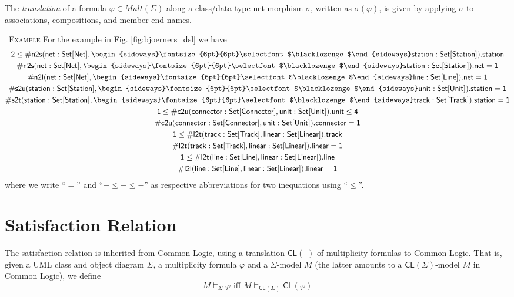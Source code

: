 \documentclass[10pt,fleqn,%
\ifpretendfinal
final%
\else
draft%
\fi,
]{scrreprt}
\newcommand*{\CL}{\ensuremath{\mathsf{CL}}\xspace}
\newenvironment{example}[0]{\ \newline \textsc{Example}\quad }{}
\newcommand{\composition}{\raisebox{0.2pt}{\begin{sideways}\fontsize{6pt}{6pt}\selectfont$\blacklozenge$\end{sideways}}}
\begin{document}
The \emph{translation} of a formula $\varphi \in \mathit{Mult}(\Sigma)$
along a class/data type net morphism $\sigma$, written as $\sigma(\varphi)$,
is given by applying $\sigma$ to associations, compositions, and member end
names.


\begin{example}
For the example in Fig. \ref{fig:bjoerners_dsl} we have
\begin{gather*}
  \mathsf{2 \leq \#n2s(net : Set[Net], \composition station : Set[Station]).station}
\\
  \mathsf{\#n2s(net : Set[Net], \composition station : Set[Station]).net = 1}
\\
  \mathsf{\#n2l(net : Set[Net], \composition line : Set[Line]).net = 1}
\\
  \mathsf{\#s2u(station : Set[Station], \composition unit : Set[Unit]).station = 1}
\\
  \mathsf{\#s2t(station : Set[Station], \composition track : Set[Track]).station = 1}
\\
  \mathsf{1 \leq \#c2u(connector : Set[Connector], unit : Set[Unit]).unit \leq 4}
\\
  \mathsf{\#c2u(connector : Set[Connector], unit : Set[Unit]).connector = 1}
\\
  \mathsf{1 \leq \#l2t(track : Set[Track], linear : Set[Linear]).track}
\\
  \mathsf{\#l2t(track : Set[Track], linear : Set[Linear]).linear = 1}
\\
  \mathsf{1 \leq \#l2t(line : Set[Line], linear : Set[Linear]).line}
\\
  \mathsf{\#l2l(line : Set[Line], linear : Set[Linear]).linear = 1}
\end{gather*}
%
where we write ``$=$'' and ``${-} \leq {-} \leq {-}$'' as respective
abbreviations for two inequations using ``$\leq$''.
\end{example}


\section{Satisfaction Relation}\label{a:UML-CD-sat}
The satisfaction relation is inherited from Common Logic, using
a translation $\CL(\_)$ of multiplicity formulas to Common Logic.
That is, given a UML class and object diagram $\Sigma$, a
multiplicity formula $\varphi$ and a $\Sigma$-model $M$ (the
latter amounts to a $\CL(\Sigma)$-model $M$ in Common Logic), we define
$$M\models_\Sigma\varphi\text{ iff }M\models_{\CL(\Sigma)}\CL(\varphi)$$
\end{document}
